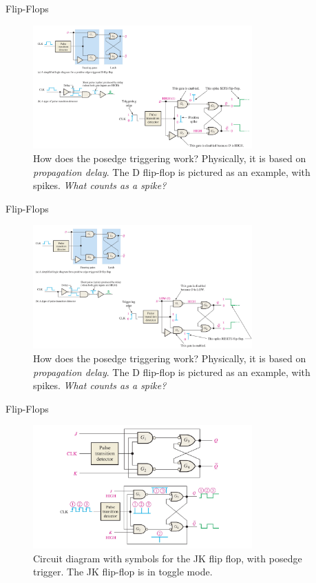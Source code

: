 \documentclass{beamer}
\begin{document}
\begin{frame}{Flip-Flops}
\begin{figure}
\centering
\includegraphics[width=0.75\textwidth]{figures/edge6.pdf}
\caption{\label{fig:ff6} How does the posedge triggering work?  Physically, it is based on \textit{propagation delay}.  The D flip-flop is pictured as an example, with spikes.  \textit{What counts as a spike?}}
\end{figure}
\end{frame}

\begin{frame}{Flip-Flops}
\begin{figure}
\centering
\includegraphics[width=0.75\textwidth]{figures/edge7.pdf}
\caption{\label{fig:ff7} How does the posedge triggering work?  Physically, it is based on \textit{propagation delay}.  The D flip-flop is pictured as an example, with spikes.  \textit{What counts as a spike?}}
\end{figure}
\end{frame}


\begin{frame}{Flip-Flops}
\begin{figure}
\centering
\includegraphics[width=0.75\textwidth]{figures/edge8.pdf}
\caption{\label{fig:ff8} Circuit diagram with symbols for the JK flip flop, with posedge trigger.  The JK flip-flop is in \alert{toggle} mode.}
\end{figure}
\end{frame}
\end{document}
